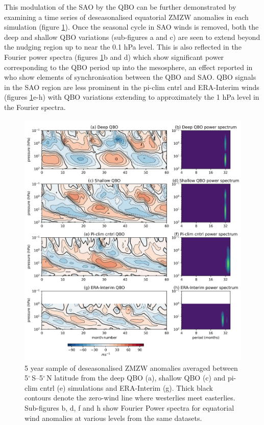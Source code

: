 This modulation of the SAO by the QBO can be further demonstrated by examining a time series of deseasonalised equatorial ZMZW anomalies in each simulation (figure \ref{fig:experiment_QBOs_anomalies}). Once the seasonal cycle in SAO winds is removed, both the deep and shallow QBO variations (sub-figures a and c) are seen to extend beyond the nudging region up to near the 0.1 hPa level. This is also reflected in the Fourier power spectra (figures \ref{fig:experiment_QBOs_anomalies}b and d) which show significant power corresponding to the QBO period up into the mesosphere, an effect reported in \cite{kuaiNonstationary2009c} who show elements of synchronisation between the QBO and SAO. QBO signals in the SAO region are less prominent in the pi-clim cntrl and ERA-Interim winds (figures \ref{fig:experiment_QBOs_anomalies}e-h) with QBO variations extending to approximately the 1 hPa level in the Fourier spectra. 

\begin{figure}[h!]
\begin{center}
\noindent\includegraphics[width = 0.75\linewidth]{Figures/Figures-deepQBO/experiment_QBOs_anomalies.png}
\caption[Equatorial ZMZW anomaly time-height profiles from QBO experiments]{5 year sample of deseasonalised ZMZW anomalies averaged between 5$^{\circ}$\,S--5$^{\circ}$\,N latitude from the deep QBO (a), shallow QBO (c) and pi-clim cntrl (e) simulations and ERA-Interim (g). Thick black contours denote the zero-wind line where westerlies meet easterlies. Sub-figures b, d, f and h show Fourier Power spectra for equatorial wind anomalies at various levels from the same datasets.}
\label{fig:experiment_QBOs_anomalies}
\end{center}
\end{figure}

